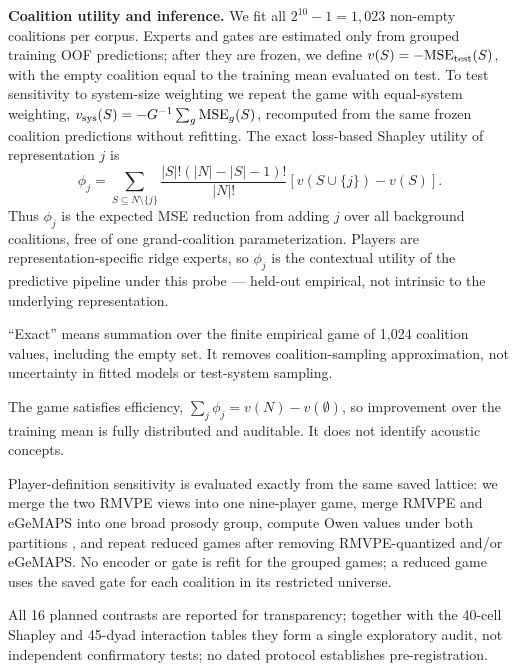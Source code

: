 \documentclass{article}
\newcommand{\shap}{\ensuremath{\phi}}
\begin{document}
\noindent\textbf{Coalition utility and inference.} We fit all
$2^{10}-1=1{,}023$ non-empty coalitions per corpus. Experts and gates are
estimated only from grouped training OOF predictions; after they are frozen,
we define $v(S)=-\mathrm{MSE}_{\rm test}(S)$, with the empty coalition equal to
the training mean evaluated on test. To test sensitivity to system-size
weighting we repeat the game with equal-system weighting,
$v_{\rm sys}(S)=-G^{-1}\sum_{g}\mathrm{MSE}_{g}(S)$, recomputed from the
same frozen coalition predictions without refitting. The exact loss-based Shapley utility
\cite{shapley1953value,kumar2020shapley} of representation $j$ is
\begin{equation}
 \shap_j=\sum_{S\subseteq N\setminus\{j\}}
 \frac{|S|!(|N|-|S|-1)!}{|N|!}
 [v(S\cup\{j\})-v(S)].
 \label{eq:shapley}
\end{equation}
Thus $\shap_j$ is the expected MSE reduction from adding $j$ over all
background coalitions, free of one grand-coalition parameterization.
Players are representation-specific ridge experts, so $\shap_j$ is the
contextual utility of the predictive pipeline under this probe ---
held-out empirical, not intrinsic to the underlying representation.

``Exact'' means summation over the finite empirical game of 1,024
coalition values, including the empty set. It removes coalition-sampling
approximation, not uncertainty in fitted models or test-system sampling.

The game satisfies efficiency,
$\sum_j\shap_j=v(N)-v(\emptyset)$, so improvement over the training mean is
fully distributed and auditable. It does not identify acoustic concepts.

Player-definition sensitivity is evaluated exactly from the same saved lattice:
we merge the two RMVPE views into one nine-player game, merge RMVPE and eGeMAPS
into one broad prosody group, compute Owen values under both partitions
\cite{owen1977apriori}, and repeat reduced games after removing RMVPE-quantized
and/or eGeMAPS. No encoder or gate is refit for the grouped games; a reduced
game uses the saved gate for each coalition in its restricted universe.

All 16 planned contrasts are reported for transparency; together with the
40-cell Shapley and 45-dyad interaction tables they form a single exploratory
audit, not independent confirmatory tests; no dated protocol establishes
pre-registration.
\end{document}
